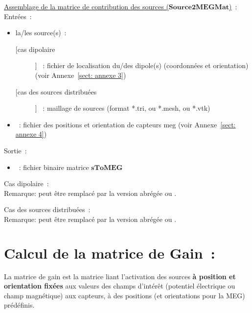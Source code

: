 \bigskip

\noindent
\underline{Assemblage de la matrice de contribution des sources ($\mathbf{Source2MEGMat}$)}~:\\
Entrées~:
\begin{itemize}
    \item la/les source(s)~:
    \begin{description}
        \item [[cas dipolaire]] ~: fichier de localisation du/des dipole(s) (coordonnées et orientation) (voir Annexe~\ref{sect: annexe 3}) 
        \item [[cas des sources distribuées]] ~: maillage de sources (format *.tri, ou *.mesh, ou *.vtk)
    \end{description}
    \item {}~: fichier des positions et orientation de capteurs meg (voir Annexe~\ref{sect: annexe 4})
\end{itemize}
Sortie~: 
\begin{itemize}
    \item {}~: fichier binaire matrice $\mathbf{sToMEG}$
\end{itemize}

\medskip

\noindent
Cas dipolaire~:\\
\noindent
{}
\medskip
Remarque:  peut être remplacé par la version abrégée  ou .

\medskip

\noindent
Cas des sources distribuées~:\\
\noindent
{}
\medskip
Remarque:  peut être remplacé par la version abrégée  ou .

\section{Calcul de la matrice de Gain~:}
\label{sect: command gain}

La matrice de gain est la matrice liant l'activation des sources \textbf{à position et orientation fixées} aux valeurs des champs d'intérêt (potentiel électrique ou champ magnétique) aux capteurs, à des positions (et orientations pour la MEG)  prédéfinis. 

